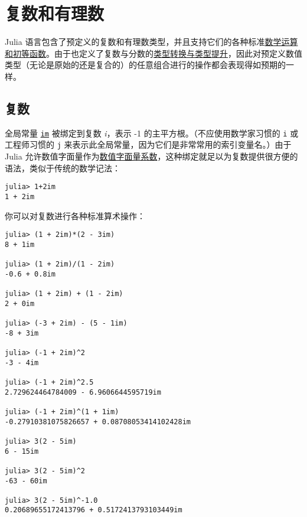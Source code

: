 \chapter{复数和有理数}



Julia 语言包含了预定义的复数和有理数类型，并且支持它们的各种标准\hyperlink{16865688524696028421}{数学运算和初等函数}。由于也定义了复数与分数的\hyperlink{10374023657104680331}{类型转换与类型提升}，因此对预定义数值类型（无论是原始的还是复合的）的任意组合进行的操作都会表现得如预期的一样。



\hypertarget{5868123017618904517}{}


\section{复数}



全局常量 \hyperlink{15097910740298861288}{\texttt{im}} 被绑定到复数 \emph{i}，表示 -1 的主平方根。（不应使用数学家习惯的 \texttt{i} 或工程师习惯的 \texttt{j} 来表示此全局常量，因为它们是非常常用的索引变量名。）由于 Julia 允许数值字面量作为\hyperlink{7285052708387693199}{数值字面量系数}，这种绑定就足以为复数提供很方便的语法，类似于传统的数学记法：




\begin{verbatim}
julia> 1+2im
1 + 2im
\end{verbatim}



你可以对复数进行各种标准算术操作：




\begin{verbatim}
julia> (1 + 2im)*(2 - 3im)
8 + 1im

julia> (1 + 2im)/(1 - 2im)
-0.6 + 0.8im

julia> (1 + 2im) + (1 - 2im)
2 + 0im

julia> (-3 + 2im) - (5 - 1im)
-8 + 3im

julia> (-1 + 2im)^2
-3 - 4im

julia> (-1 + 2im)^2.5
2.729624464784009 - 6.9606644595719im

julia> (-1 + 2im)^(1 + 1im)
-0.27910381075826657 + 0.08708053414102428im

julia> 3(2 - 5im)
6 - 15im

julia> 3(2 - 5im)^2
-63 - 60im

julia> 3(2 - 5im)^-1.0
0.20689655172413796 + 0.5172413793103449im
\end{verbatim}



